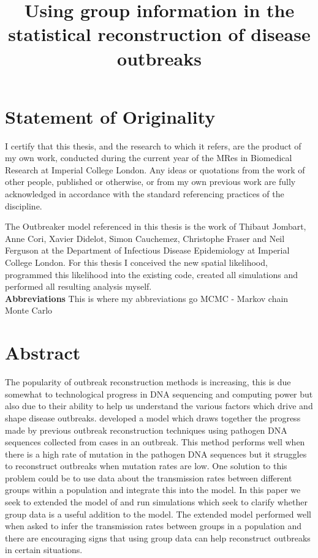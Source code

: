 \documentclass[11pt,a4paper]{report}
\title{Using group information in the statistical reconstruction of disease outbreaks}
\begin{document}
\maketitle




\chapter*{Statement of Originality}
\thispagestyle{empty}
\noindent I certify that this thesis, and the research to which it refers, are the product of my own work, conducted during the current year of the MRes in Biomedical Research at Imperial College London. Any ideas or quotations from the work of other people, published or otherwise, or from my own previous work are fully acknowledged in accordance with the standard referencing practices of the discipline. 


The Outbreaker model referenced in this thesis is the work of Thibaut Jombart, Anne Cori, Xavier Didelot, Simon Cauchemez, Christophe Fraser and Neil Ferguson at the Department of Infectious Disease Epidemiology at Imperial College London. For this thesis I conceived the new spatial likelihood, programmed this likelihood into the existing code, created all simulations and performed all resulting analysis myself.\\
\newline
\noindent
{\bf{\LARGE Abbreviations}}
This is where my abbreviations go
MCMC - Markov chain Monte Carlo
\newpage

\chapter*{Abstract}
\thispagestyle{empty}
The popularity of outbreak reconstruction methods is increasing, this is due somewhat to technological progress in DNA sequencing and computing power but also due to their ability to help us understand the various factors which drive and shape disease outbreaks. \citet{outbrkr} developed a model which draws together the progress made by previous outbreak reconstruction techniques using pathogen DNA sequences collected from cases in an outbreak. This method performs well when there is a high rate of mutation in the pathogen DNA sequences but it struggles to reconstruct outbreaks when mutation rates are low. One solution to this problem could be to use data about the transmission rates between different groups within a population and integrate this into the model. In this paper we seek to extended the model of \citet{outbrkr} and run simulations which seek to clarify whether group data is a useful addition to the model. The extended model performed well when asked to infer the transmission rates between groups in a population and there are encouraging signs that using group data can help reconstruct outbreaks in certain situations.
\end{document}
